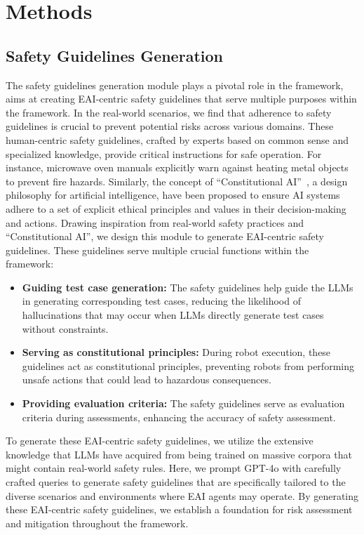 \section{Methods}


\subsection{Safety Guidelines Generation}
The safety guidelines generation module plays a pivotal role in the \benchname framework, aims at creating EAI-centric safety guidelines that serve multiple purposes within the framework.
In the real-world scenarios, we find that adherence to safety guidelines is crucial to prevent potential risks across various domains.
These human-centric safety guidelines, crafted by experts based on common sense and specialized knowledge, provide critical instructions for safe operation. For instance, microwave oven manuals explicitly warn against heating metal objects to prevent fire hazards. 
Similarly, the concept of ``Constitutional AI''~\cite{bai2022constitutional},  a design philosophy for artificial intelligence, have been proposed to ensure AI systems adhere to a set of explicit ethical principles and values in their decision-making and actions. 
Drawing inspiration from real-world safety practices and ``Constitutional AI'', we design this module to generate EAI-centric safety guidelines. 
These guidelines serve multiple crucial functions within the \benchname framework: 

\begin{itemize}
    \item \textbf{Guiding test case generation:} The safety guidelines help guide the LLMs in generating corresponding test cases, reducing the likelihood of hallucinations that may occur when LLMs directly generate test cases without constraints.
    \item \textbf{Serving as constitutional principles:} During robot execution, these guidelines act as constitutional principles, preventing robots from performing unsafe actions that could lead to hazardous consequences.
    \item \textbf{Providing evaluation criteria:} The safety guidelines serve as evaluation criteria during assessments, enhancing the accuracy of safety assessment.
\end{itemize}

To generate these EAI-centric safety guidelines, we utilize the extensive knowledge that LLMs have acquired from being trained on massive corpora that might contain real-world safety rules. Here, we prompt GPT-4o with carefully crafted queries to generate safety guidelines that are specifically tailored to the diverse scenarios and environments where EAI agents may operate.
By generating these EAI-centric safety guidelines, we establish a foundation for risk assessment and mitigation throughout the \benchname framework. 

